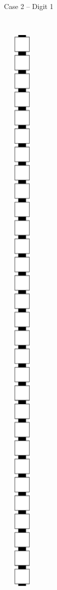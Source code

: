 \begin{enumerate}[label={--}]
\begin{figure}[h]
\begin{subfigure}[t]{0.2\textwidth}
                        \caption{\label{fig:warping/pre_warp_case2_digit1_msr} Case 2 -- Digit 1}
                    \end{subfigure}%
                    ~
                    \begin{subfigure}[t]{0.2\textwidth}
                        \centering
                        \includegraphics[width=0.2\textwidth]{warping/pre_warp_case2_digit2_msr}

\end{subfigure}
\end{figure}
\end{enumerate}
